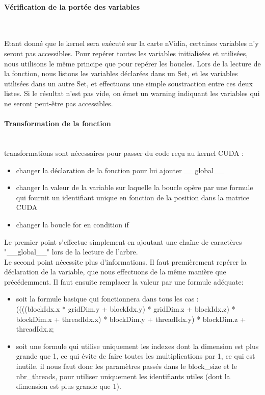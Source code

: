 \documentclass{article}
\begin{document}
	
	\paragraph{Vérification de la portée des variables}
	~~\\
	\indent

	Etant donné que le kernel sera exécuté sur la carte nVidia, certaines variables n'y seront pas accessibles. Pour repérer toutes les variables initialisées et utilisées, nous utilisons le même principe que pour repérer les boucles. Lors de la lecture de la fonction, nous listons les variables déclarées dans un Set, et les variables utilisées dans un autre Set, et effectuons une simple soustraction entre ces deux listes. Si le résultat n'est pas vide, on émet un warning indiquant les variables qui ne seront peut-être pas accessibles.
	
	\paragraph{Transformation de la fonction}
	~~\\
	 transformations sont nécessaires pour passer du code reçu au kernel CUDA :
	\begin{itemize}
		\item changer la déclaration de la fonction pour lui ajouter \_\_global\_\_
		\item changer la valeur de la variable sur laquelle la boucle opère par une formule qui fournit un identifiant unique en fonction de la position dans la matrice CUDA
		\item changer la boucle for en condition if
	\end{itemize}
	Le premier point s'effectue simplement en ajoutant une chaîne de caractères "\_\_global\_\_" lors de la lecture de l'arbre.
	\\Le second point nécessite plus d'informations. Il faut premièrement repérer la déclaration de la variable, que nous effectuons de la même manière que précédemment. Il faut ensuite remplacer la valeur par une formule adéquate:
	\begin{itemize}
	\item soit la formule basique qui fonctionnera dans tous les cas : 
	\\ ((((blockIdx.x * gridDim.y + blockIdx.y) * gridDim.z + blockIdx.z) * blockDim.x + threadIdx.x) * blockDim.y + threadIdx.y) * blockDim.z + threadIdx.z;
	\item soit une formule qui utilise uniquement les indexes dont la dimension est plus grande que 1, ce qui évite de faire toutes les multiplications par 1, ce qui est inutile. il nous faut donc les paramètres passés dans le block\_size et le nbr\_threads, pour utiliser uniquement les identifiants utiles (dont la dimension est plus grande que 1).
	\end{itemize}
	
\end{document}
